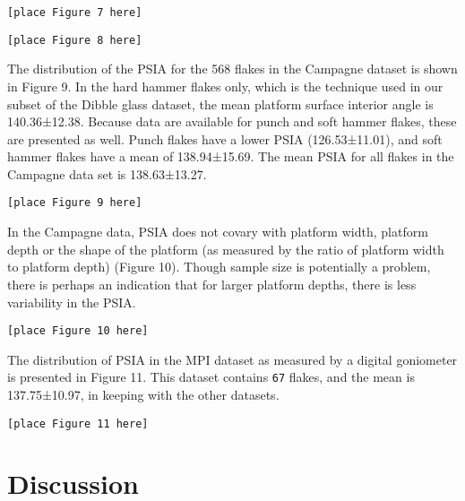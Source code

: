 \documentclass[10pt,letterpaper]{article}
\begin{document}
\begin{verbatim}
[place Figure 7 here]
\end{verbatim}

\begin{verbatim}
[place Figure 8 here]
\end{verbatim}

The distribution of the PSIA for the 568 flakes in the Campagne dataset
is shown in Figure 9. In the hard hammer flakes only, which is the
technique used in our subset of the Dibble glass dataset, the mean
platform surface interior angle is 140.36±12.38. Because data are
available for punch and soft hammer flakes, these are presented as well.
Punch flakes have a lower PSIA (126.53±11.01), and soft hammer flakes
have a mean of 138.94±15.69. The mean PSIA for all flakes in the
Campagne data set is 138.63±13.27.

\begin{verbatim}
[place Figure 9 here]
\end{verbatim}

In the Campagne data, PSIA does not covary with platform width, platform
depth or the shape of the platform (as measured by the ratio of platform
width to platform depth) (Figure 10). Though sample size is potentially
a problem, there is perhaps an indication that for larger platform
depths, there is less variability in the PSIA.

\begin{verbatim}
[place Figure 10 here]
\end{verbatim}

The distribution of PSIA in the MPI dataset as measured by a digital
goniometer is presented in Figure 11. This dataset contains \texttt{67}
flakes, and the mean is 137.75±10.97, in keeping with the other
datasets.

\begin{verbatim}
[place Figure 11 here]
\end{verbatim}

\hypertarget{discussion}{%
\section{Discussion}\label{discussion}}
\end{document}
